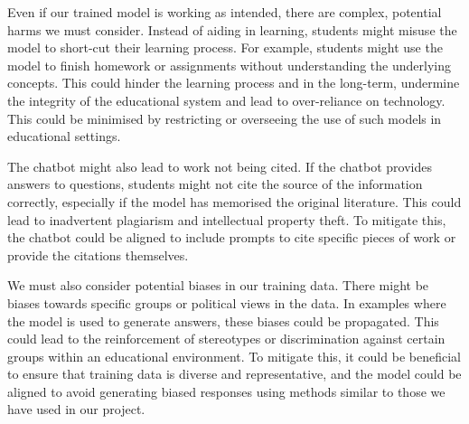 Even if our trained model is working as intended, there are complex, potential
harms we must consider. Instead of aiding in learning, students might misuse the
model to short-cut their learning process. For example, students might use the
model to finish homework or assignments without understanding the underlying
concepts. This could hinder the learning process and in the long-term, undermine
the integrity of the educational system and lead to over-reliance on technology.
This could be minimised by restricting or overseeing the use of such models in
educational settings.

The chatbot might also lead to work not being cited. If the chatbot provides
answers to questions, students might not cite the source of the information
correctly, especially if the model has memorised the original literature.  This
could lead to inadvertent plagiarism and intellectual property theft. To
mitigate this, the chatbot could be aligned to include prompts to cite specific
pieces of work or provide the citations themselves.

We must also consider potential biases in our training data. There might be
biases towards specific groups or political views in the data. In examples where
the model is used to generate answers, these biases could be propagated. This
could lead to the reinforcement of stereotypes or discrimination against certain
groups within an educational environment. To mitigate this, it could be
beneficial to ensure that training data is diverse and representative, and the
model could be aligned to avoid generating biased responses using methods
similar to those we have used in our project.